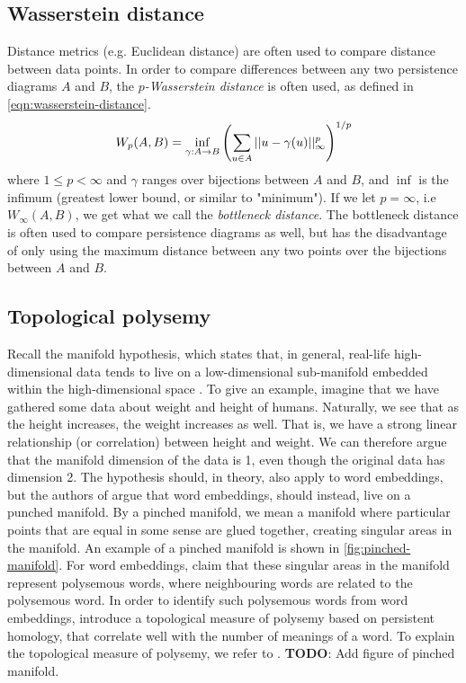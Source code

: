 \subsection{Wasserstein distance}
\label{sec:wasserstein-distance}
Distance metrics (e.g. Euclidean distance) are often used to compare distance between data points. In order to compare differences between any two persistence diagrams $A$ and $B$, the $p$\textit{-Wasserstein distance} is often used, as defined in \cref{eqn:wasserstein-distance}.
\begin{align}
    W_p(A, B) = \inf_{\gamma: A \rightarrow B} \left(\sum\limits_{u \in A}^{} ||u - \gamma(u)||_{\infty}^{p}\right)^{1/p}
    \label{eqn:wasserstein-distance}
\end{align}
where $1 \leq p < \infty$ and $\gamma$ ranges over bijections between $A$ and $B$, and $\inf$ is the infimum (greatest lower bound, or similar to "minimum"). If we let $p=\infty$, i.e $W_\infty(A, B)$, we get what we call the \textit{bottleneck distance}. The bottleneck distance is often used to compare persistence diagrams as well, but has the disadvantage of only using the maximum distance between any two points over the bijections between $A$ and $B$.

\subsection{Topological polysemy}
\label{sec:topological-polysemy}
Recall the manifold hypothesis, which states that, in general, real-life high-dimensional data tends to live on a low-dimensional sub-manifold embedded within the high-dimensional space \cite[p. 16]{bengio2014representation}. To give an example, imagine that we have gathered some data about weight and height of humans. Naturally, we see that as the height increases, the weight increases as well. That is, we have a strong linear relationship (or correlation) between height and weight. We can therefore argue that the manifold dimension of the data is 1, even though the original data has dimension 2. The hypothesis should, in theory, also apply to word embeddings, but the authors of \cite{jakubowski2020topology} argue that word embeddings, should instead, live on a punched manifold. By a pinched manifold, we mean a manifold where particular points that are equal in some sense are glued together, creating singular areas in the manifold. An example of a pinched manifold is shown in \cref{fig:pinched-manifold}. For word embeddings, \cite{jakubowski2020topology} claim that these singular areas in the manifold represent polysemous words, where neighbouring words are related to the polysemous word. In order to identify such polysemous words from word embeddings, \cite{jakubowski2020topology} introduce a topological measure of polysemy based on persistent homology, that correlate well with the number of meanings of a word. To explain the topological measure of polysemy, we refer to \cite{jakubowski2020topology}.
\textbf{TODO}: Add figure of pinched manifold.

